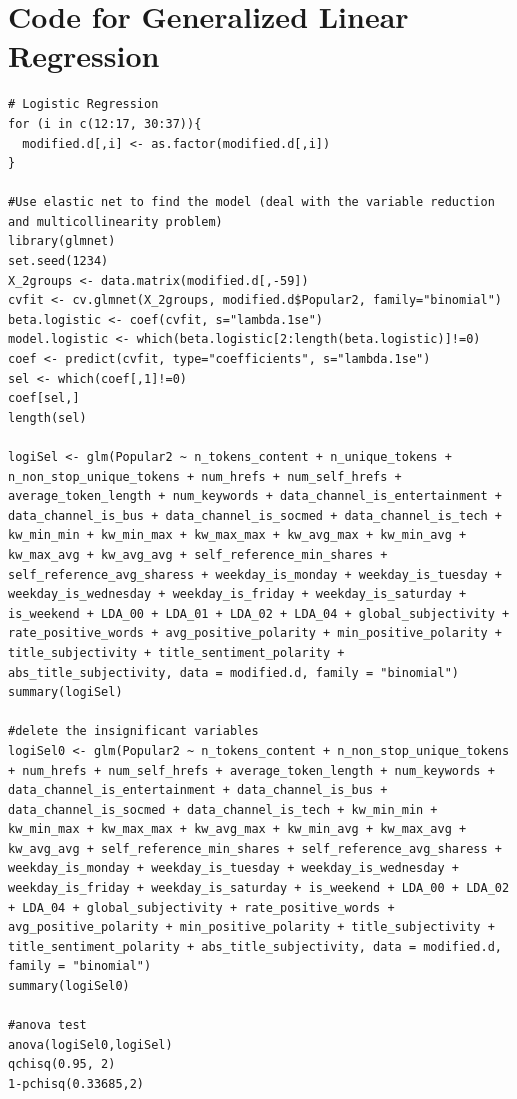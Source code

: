 \documentclass[letterpaper,12pt]{article}
\begin{document}
\section{Code for Generalized Linear Regression}
\begin{lstlisting}
# Logistic Regression
for (i in c(12:17, 30:37)){
  modified.d[,i] <- as.factor(modified.d[,i])
}

#Use elastic net to find the model (deal with the variable reduction and multicollinearity problem)
library(glmnet)
set.seed(1234)
X_2groups <- data.matrix(modified.d[,-59])
cvfit <- cv.glmnet(X_2groups, modified.d$Popular2, family="binomial")
beta.logistic <- coef(cvfit, s="lambda.1se")
model.logistic <- which(beta.logistic[2:length(beta.logistic)]!=0)
coef <- predict(cvfit, type="coefficients", s="lambda.1se")
sel <- which(coef[,1]!=0)
coef[sel,]
length(sel)

logiSel <- glm(Popular2 ~ n_tokens_content + n_unique_tokens + n_non_stop_unique_tokens + num_hrefs + num_self_hrefs + average_token_length + num_keywords + data_channel_is_entertainment + data_channel_is_bus + data_channel_is_socmed + data_channel_is_tech + kw_min_min + kw_min_max + kw_max_max + kw_avg_max + kw_min_avg + kw_max_avg + kw_avg_avg + self_reference_min_shares + self_reference_avg_sharess + weekday_is_monday + weekday_is_tuesday + weekday_is_wednesday + weekday_is_friday + weekday_is_saturday + is_weekend + LDA_00 + LDA_01 + LDA_02 + LDA_04 + global_subjectivity + rate_positive_words + avg_positive_polarity + min_positive_polarity + title_subjectivity + title_sentiment_polarity + abs_title_subjectivity, data = modified.d, family = "binomial")
summary(logiSel)

#delete the insignificant variables
logiSel0 <- glm(Popular2 ~ n_tokens_content + n_non_stop_unique_tokens + num_hrefs + num_self_hrefs + average_token_length + num_keywords + data_channel_is_entertainment + data_channel_is_bus + data_channel_is_socmed + data_channel_is_tech + kw_min_min + kw_min_max + kw_max_max + kw_avg_max + kw_min_avg + kw_max_avg + kw_avg_avg + self_reference_min_shares + self_reference_avg_sharess + weekday_is_monday + weekday_is_tuesday + weekday_is_wednesday + weekday_is_friday + weekday_is_saturday + is_weekend + LDA_00 + LDA_02 + LDA_04 + global_subjectivity + rate_positive_words + avg_positive_polarity + min_positive_polarity + title_subjectivity + title_sentiment_polarity + abs_title_subjectivity, data = modified.d, family = "binomial")
summary(logiSel0)

#anova test
anova(logiSel0,logiSel)
qchisq(0.95, 2)
1-pchisq(0.33685,2)


\end{lstlisting}
\end{document}
